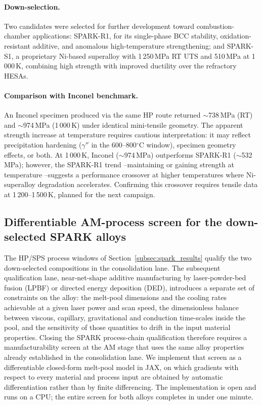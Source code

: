 \documentclass[11pt,a4paper]{article}
\begin{document}
\paragraph{Down-selection.} Two candidates were selected for further development toward combustion-chamber applications: SPARK-R1, for its single-phase BCC stability, oxidation-resistant additive, and anomalous high-temperature strengthening; and SPARK-S1, a proprietary Ni-based superalloy with 1\,250\,MPa RT UTS and 510\,MPa at 1\,000\,K, combining high strength with improved ductility over the refractory HESAs.

\paragraph{Comparison with Inconel benchmark.} An Inconel specimen produced via the same HP route returned $\sim$738\,MPa (RT) and $\sim$974\,MPa (1\,000\,K) under identical mini-tensile geometry. The apparent strength increase at temperature requires cautious interpretation: it may reflect precipitation hardening ($\gamma''$ in the 600--800$^\circ$C window), specimen geometry effects, or both. At 1\,000\,K, Inconel ($\sim$974\,MPa) outperforms SPARK-R1 ($\sim$532\,MPa); however, the SPARK-R1 trend --maintaining or gaining strength at temperature --suggests a performance crossover at higher temperatures where Ni-superalloy degradation accelerates. Confirming this crossover requires tensile data at 1\,200--1\,500\,K, planned for the next campaign.

\subsection{Differentiable AM-process screen for the down-selected SPARK alloys}
\label{subsec:am_screen}

The HP/SPS process windows of Section~\ref{subsec:spark_results} qualify the two down-selected compositions in the consolidation lane. The subsequent qualification lane, near-net-shape additive manufacturing by laser-powder-bed fusion (LPBF) or directed energy deposition (DED), introduces a separate set of constraints on the alloy: the melt-pool dimensions and the cooling rates achievable at a given laser power and scan speed, the dimensionless balance between viscous, capillary, gravitational and conduction time-scales inside the pool, and the sensitivity of those quantities to drift in the input material properties. Closing the SPARK process-chain qualification therefore requires a manufacturability screen at the AM stage that uses the same alloy properties already established in the consolidation lane. We implement that screen as a differentiable closed-form melt-pool model in JAX, on which gradients with respect to every material and process input are obtained by automatic differentiation rather than by finite differencing. The implementation is open and runs on a CPU; the entire screen for both alloys completes in under one minute.
\end{document}
